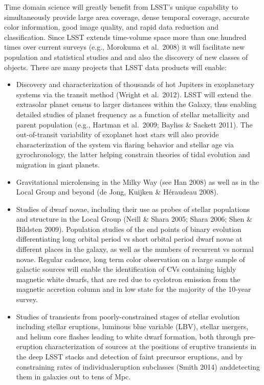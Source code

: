 Time domain science will greatly benefit from LSST's unique capability
to simultaneously provide large area coverage, dense temporal
coverage, accurate color information, good image quality, and rapid
data reduction and classification. Since LSST extends time-volume
space more than one hundred times over current surveys (e.g., Morokuma
et al.~2008) it will facilitate new population and statistical studies and
and also the discovery of new classes of
objects.  There are many projects that LSST data products will enable:

\begin{itemize}


\item Discovery and characterization of thousands of hot Jupiters 
  in exoplanetary systems via the transit method (Wright et al.~2012). 
LSST will extend the extrasolar planet census to larger distances within the Galaxy, thus enabling detailed studies 
of planet frequency as a function of stellar metallicity and parent population (e.g., Hartman et al.~2009; Bayliss \& 
Sackett 2011). The out-of-transit variability of exoplanet host stars will also provide characterization of the system 
via flaring behavior and stellar age via gyrochronology, the latter helping constrain theories of tidal evolution and 
migration in giant planets. 

\item Gravitational microlensing in the Milky Way (see Han 2008) as well as in the Local Group and beyond (de Jong, Kuijken \& H\'{e}raudeau 2008).

\item Studies of dwarf novae, including their use as probes of stellar populations and 
      structure in the Local Group (Neill \& Shara 2005; Shara 2006; Shen \& Bildsten 2009). Population studies of the end points of binary evolution differentiating long orbital period vs short orbital period dwarf novae at different places in the galaxy, as well as the numbers of recurrent vs normal novae. Regular cadence, long term color observation on a large sample of galactic sources will enable the identification of CVs containing highly magnetic white dwarfs, that are red due to cyclotron emission from the magnetic accretion column and in low state for the majority of the 10-year survey. 

\item Studies of  transients from poorly-constrained stages of stellar evolution including  
stellar eruptions,  luminous blue variable (LBV), stellar mergers, and helium core flashes leading to white dwarf formation,  both through pre-eruption characterization of sources at the positions of eruptive transients in the ​deep LSST ​stacks​ and detection of faint precursor eruptions, and by constraining rates of individual ​eruption ​subclasses​ (Smith 2014)​​ anddetecting them in galaxies out to tens of Mpc.


\end{itemize}
